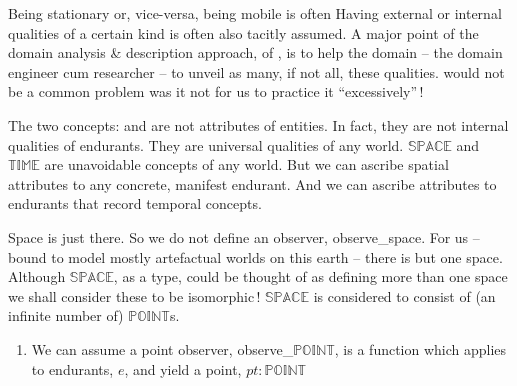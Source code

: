 \treprikker

\mnewfoil

\noindent
\begynd
\pind Being stationary or, vice-versa, being mobile \nyl is often 
\begynd
\pind Having external or internal qualities of a certain kind \nyl is often
      also tacitly assumed.
\pind A major point of the domain analysis \& description approach,
\begynd
\pind of ,
\pind is to help the domain  --
\pind the domain engineer cum researcher --
\pind to unveil as many, if not all, these qualities.
\afslut
\pind {} would not be a common problem \nyl
      was it not for us to practice it ``excessively''\,!
\afslut
\afslut




\label{space and time} %

\begynd
\pind The two concepts:  and  are not
      attributes of entities.
\pind In fact, they are not internal qualities of endurants.
\pind They are universal qualities of any world.
\begynd
\pind {} $\mathbb{SPACE}$ and $\mathbb{TIME}$ are
      unavoidable concepts of any world.
\pind But we can ascribe spatial attributes to any concrete, manifest endurant.
\pind And we can ascribe attributes to endurants that record temporal concepts.
\afslut
\afslut

\label{spatial-attributes}

\begynd
\pind Space is just there.
\begynd
\pind So we do not define an observer, \textsf{observe\_space}.
\pind For us -- bound to model mostly artefactual worlds on this earth -- there is but
      one space.
\pind Although $\mathbb{SPACE}$, as a type, could be thought of as defining more than one space
      we shall consider these to be isomorphic\,!
\afslut
\pind $\mathbb{SPACE}$ is considered to consist of \nyl (an
      infinite number of) $\mathbb{POINT}$s.

\begin{enumerate}\setei
\item \label{space-0000} We can assume a point observer,
  \textsf{observe\_$\mathbb{POINT}$}, is a function which applies to
  endurants, $e$, and yield  a point, $pt:\mathbb{POINT}$
\savei\end{enumerate}

